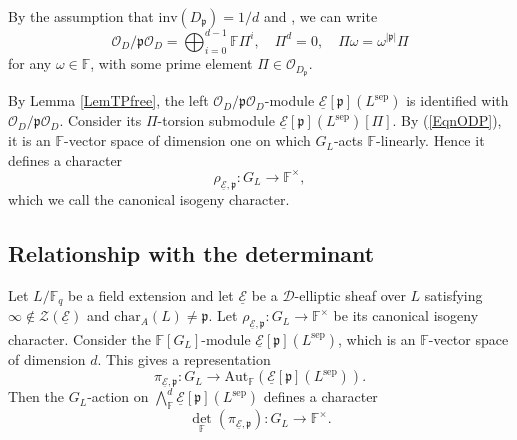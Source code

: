 \documentclass[10pt]{amsart}
\theoremstyle{plain}
\theoremstyle{definition}
\newtheorem{dfn}[thm]{Definition}
\newcommand{\Aut}{\mathrm{Aut}}
\newcommand{\chr}{\mathrm{char}}
\newcommand{\inv}{\mathrm{inv}}
\newcommand{\sep}{\mathrm{sep}}
\newcommand{\cO}{\mathcal{O}}
\newcommand{\cZ}{\mathcal{Z}}
\newcommand{\ucE}{\underline{\mathcal{E}}}
\newcommand{\bF}{\mathbb{F}}
\newcommand{\sD}{\mathscr{D}}
\newcommand{\frp}{\mathfrak{p}}
\begin{document}
By the assumption that $\inv(D_\frp)=1/d$ and \cite[Theorem 14.5]{Rei}, we can write
\begin{equation}\label{EqnODP}
	\cO_{D}/\frp \cO_{D}=\bigoplus_{i=0}^{d-1}\bF\Pi^i,\quad \Pi^d=0,\quad \Pi \omega=\omega^{|\frp|}\Pi
\end{equation}
for any $\omega\in\bF$, with some prime element $\Pi\in \cO_{D_\frp}$.

By Lemma \ref{LemTPfree}, the left
$\cO_{D}/\frp \cO_{D}$-module $\ucE[\frp](L^\sep)$ is identified with $\cO_{D}/\frp \cO_{D}$.
Consider its $\Pi$-torsion submodule $\ucE[\frp](L^\sep)[\Pi]$.
By (\ref{EqnODP}), it is an $\bF$-vector space of dimension one on which $G_L$-acts $\bF$-linearly.
Hence it defines 
a character
\[
\rho_{\ucE,\frp}:G_L\to \bF^\times,
\]
which we call the canonical isogeny character.




\subsection{Relationship with the determinant}\label{SubsecCanIsogCharWithDet}

Let $L/\bF_q$ be a field extension and let $\ucE$ be a $\sD$-elliptic sheaf over $L$ satisfying $\infty\notin \cZ(\ucE)$ and $\chr_A(L)\neq \frp$.
Let $\rho_{\ucE,\frp}:G_L\to \bF^\times$ be its canonical isogeny character.
Consider the $\bF[G_L]$-module $\ucE[\frp](L^\sep)$, which is an $\bF$-vector space of dimension $d$. This gives a representation
\[
\pi_{\ucE,\frp}:G_L\to \Aut_{\bF}(\ucE[\frp](L^\sep)).
\]
Then the $G_L$-action on 
$\bigwedge_{\bF}^d \ucE[\frp](L^\sep)$ defines a character
\[
\det_{\bF}(\pi_{\ucE,\frp}):G_L\to \bF^\times.
\]
\end{document}
